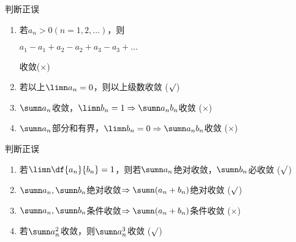
\begin{frame}{判断正误}
	\linespread{1.5}
	\begin{enumerate}\pause 
	  \item 若$a_n>0(n=1,2,\ldots)$，则\\
	  \centerline{$a_1-a_1+a_2-a_2+a_3-a_3+\ldots $}
	  收敛\pause \quad (\alert{$\times$})\pause
	  \item 若以上$\limn a_n=0$，则以上级数收敛\pause \quad
	  (\alert{$\surd$})\pause
	  \item $\sumn a_n$收敛，$\limn b_n=1\Rightarrow\sumn a_nb_n$收敛\pause
	  \quad (\alert{$\times$})\pause
	  \item $\sumn a_n$部分和有界，$\limn b_n=0\Rightarrow\sumn a_nb_n$收敛\pause
	  \quad (\alert{$\times$})
	\end{enumerate}
\end{frame}

\begin{frame}{判断正误}
	\linespread{1.5}
	\begin{enumerate}\pause 
	  \addtocounter{enumi}{4}
	  \item 若$\limn\df{a_n}{b_n}=1$，则若$\sumn a_n$绝对收敛，$\sumn b_n$必收敛\pause \quad
	  (\alert{$\surd$})\pause
	  \item $\sumn a_n,\sumn b_n$绝对收敛$\Rightarrow\sumn (a_n+b_n)$绝对收敛\pause \quad
	  (\alert{$\surd$})\pause
	  \item $\sumn a_n,\sumn b_n$条件收敛$\Rightarrow\sumn (a_n+b_n)$条件收敛\pause \quad
	  (\alert{$\times$})\pause
	  \item 若$\sumn a_n^2$收敛，则$\sumn a_n^3$收敛\pause \quad
	  (\alert{$\surd$})
	\end{enumerate}
\end{frame}

